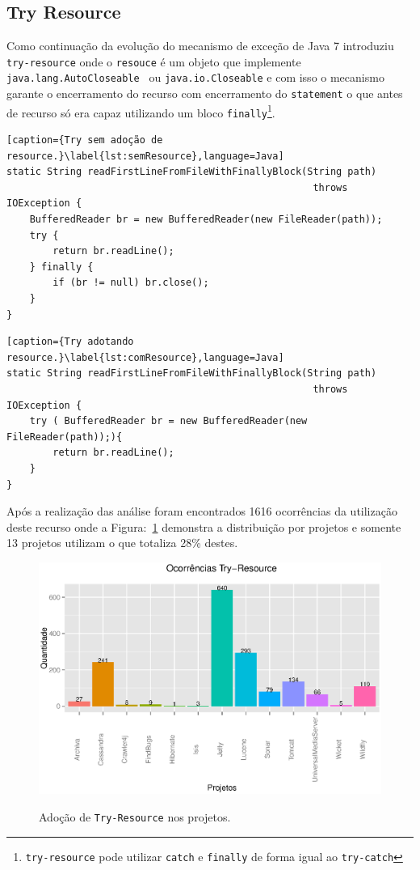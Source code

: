 \subsection{Try Resource}
Como continuação da evolução do mecanismo de exceção de Java 7 introduziu \texttt{try-resource} onde o \texttt{resouce} é um objeto que implemente \texttt{java.lang.AutoCloseable } ou \texttt{java.io.Closeable} e com isso o mecanismo garante o encerramento do recurso com encerramento do \texttt{statement} o que antes de recurso só era capaz utilizando um bloco \texttt{finally}\footnote{\texttt{try-resource} pode utilizar \texttt{catch} e \texttt{finally} de forma igual ao \texttt{try-catch}}.

\begin{lstlisting}[caption={Try sem adoção de resource.}\label{lst:semResource},language=Java]
static String readFirstLineFromFileWithFinallyBlock(String path)
                                                     throws IOException {
    BufferedReader br = new BufferedReader(new FileReader(path));
    try {
        return br.readLine();
    } finally {
        if (br != null) br.close();
    }
}
\end{lstlisting}

\begin{lstlisting}[caption={Try adotando resource.}\label{lst:comResource},language=Java]
static String readFirstLineFromFileWithFinallyBlock(String path)
                                                     throws IOException {
    try ( BufferedReader br = new BufferedReader(new FileReader(path));){
        return br.readLine();
    } 
}
\end{lstlisting}

Após a realização das análise foram encontrados \num{1616} ocorrências da utilização deste recurso onde a Figura:~\ref{fig:Try-Resource} demonstra a distribuição por projetos e somente 13 projetos utilizam o que totaliza  \num{28}\% destes.

\begin{figure}[h]
	\center
	\includegraphics[scale=0.62]{Imagens/ocorrenciasTryResource}
	\label{fig:Try-Resource}
	\caption{Adoção de \texttt{Try-Resource} nos projetos.}
\end{figure}

